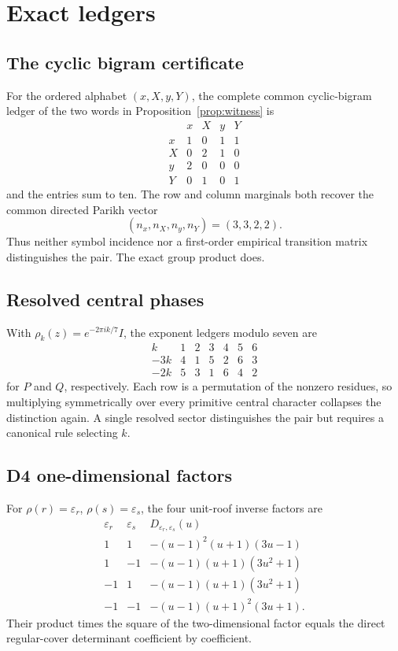 \section{Exact ledgers}
\label{app:ledgers}

\subsection{The cyclic bigram certificate}

For the ordered alphabet \((x,X,y,Y)\), the complete common cyclic-bigram
ledger of the two words in Proposition~\ref{prop:witness} is
\[
\begin{array}{c|rrrr}
 & x & X & y & Y\\
\hline
x & 1&0&1&1\\
X & 0&2&1&0\\
y & 2&0&0&0\\
Y & 0&1&0&1
\end{array}
\]
and the entries sum to ten. The row and column marginals both recover the
common directed Parikh vector
\[
(n_x,n_X,n_y,n_Y)=(3,3,2,2).
\]
Thus neither symbol incidence nor a first-order empirical transition matrix
distinguishes the pair. The exact group product does.

\subsection{Resolved central phases}

With \(\rho_k(z)=e^{-2\pi ik/7}I\), the exponent ledgers modulo seven are
\[
\begin{array}{c|rrrrrr}
k&1&2&3&4&5&6\\
\hline
-3k&4&1&5&2&6&3\\
-2k&5&3&1&6&4&2
\end{array}
\]
for \(P\) and \(Q\), respectively. Each row is a permutation of the nonzero
residues, so multiplying symmetrically over every primitive central character
collapses the distinction again. A single resolved sector distinguishes the
pair but requires a canonical rule selecting \(k\).

\subsection{D4 one-dimensional factors}

For \(\rho(r)=\varepsilon_r\), \(\rho(s)=\varepsilon_s\), the four unit-roof
inverse factors are
\[
\begin{array}{c|c|l}
\varepsilon_r&\varepsilon_s&D_{\varepsilon_r,\varepsilon_s}(u)\\
\hline
1&1&-(u-1)^2(u+1)(3u-1)\\
1&-1&-(u-1)(u+1)(3u^2+1)\\
-1&1&-(u-1)(u+1)(3u^2+1)\\
-1&-1&-(u-1)(u+1)^2(3u+1).
\end{array}
\]
Their product times the square of the two-dimensional factor equals the
direct regular-cover determinant coefficient by coefficient.

